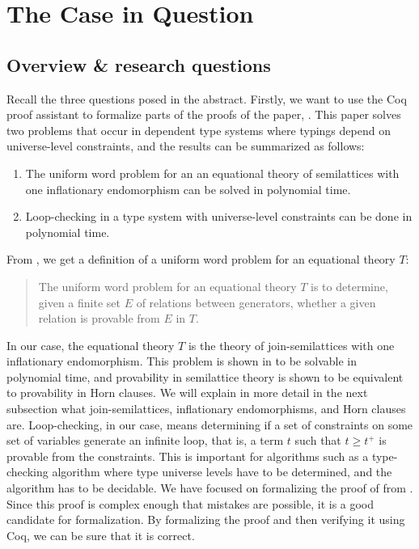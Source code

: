 \chapter{The Case in Question}
\label{ch:the_case_in_question}

\section{Overview \& research questions}
\label{sec:overview}

Recall the three questions posed in the abstract.
Firstly, we want to use the Coq proof assistant to formalize parts of the proofs of the paper, \citeauthor{mbezem} \cite{mbezem}.
This paper solves two problems that occur in dependent type systems where typings depend
on universe-level constraints, and the results can be summarized as follows:

\begin{enumerate}
    \item The uniform word problem for an an equational theory of semilattices
          with one inflationary endomorphism can be solved in polynomial time.
    \item Loop-checking in a type system with universe-level constraints
          can be done in polynomial time.
\end{enumerate}

From \cite{mbezem}, we get a definition of a uniform word problem for an equational theory $T$:

\begin{quote}
The uniform word problem for an equational theory $T$ is to determine,
given a finite set $E$ of relations between generators,
whether a given relation is provable from $E$ in $T$.
\end{quote}
In our case, the equational theory $T$ is the theory of join-semilattices
with one inflationary endomorphism.
This problem is shown in \cite{mbezem} to be solvable in polynomial time,
and provability in semilattice theory is shown to be equivalent to
provability in Horn clauses.
We will explain in more detail in the next subsection what join-semilattices,
inflationary endomorphisms, and Horn clauses are.
Loop-checking, in our case, means determining if a set of constraints
on some set of variables generate an infinite loop, that is,
a term $t$ such that $t \geq t^+$ is provable from the constraints.
This is important for algorithms such as a type-checking algorithm where
type universe levels have to be determined, and the algorithm has to be decidable.
We have focused on formalizing the proof of  from \cite{mbezem}.
Since this proof is complex enough that mistakes are possible, it is a good candidate for formalization.
By formalizing the proof and then verifying it using Coq, we can be sure that it is correct.

